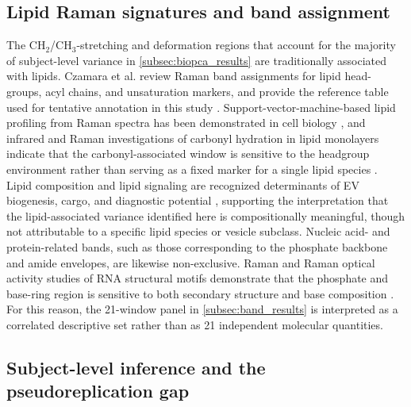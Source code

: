 \documentclass[preprint,12pt]{elsarticle}
\begin{document}
\subsection{Lipid Raman signatures and band assignment} \label{subsec:related_lipid_bands}

The CH$_2$/CH$_3$-stretching and deformation regions that account for the majority of subject-level variance in \cref{subsec:biopca_results} are traditionally associated with lipids. Czamara et al. review Raman band assignments for lipid head-groups, acyl chains, and unsaturation markers, and provide the reference table used for tentative annotation in this study \cite{czamara2015}. Support-vector-machine-based lipid profiling from Raman spectra has been demonstrated in cell biology \cite{potcoava2021}, and infrared and Raman investigations of carbonyl hydration in lipid monolayers indicate that the carbonyl-associated window is sensitive to the headgroup environment rather than serving as a fixed marker for a single lipid species \cite{dreier2019}. Lipid composition and lipid signaling are recognized determinants of EV biogenesis, cargo, and diagnostic potential \cite{ghadami2023,fyfe2023, zhang2025}, supporting the interpretation that the lipid-associated variance identified here is compositionally meaningful, though not attributable to a specific lipid species or vesicle subclass. Nucleic acid- and protein-related bands, such as those corresponding to the phosphate backbone and amide envelopes, are likewise non-exclusive. Raman and Raman optical activity studies of RNA structural motifs demonstrate that the phosphate and base-ring region is sensitive to both secondary structure and base composition \cite{hobro2007}. For this reason, the 21-window panel in \cref{subsec:band_results} is interpreted as a correlated descriptive set rather than as 21 independent molecular quantities.

\subsection{Subject-level inference and the pseudoreplication gap} \label{subsec:related_pseudoreplication}
\end{document}
